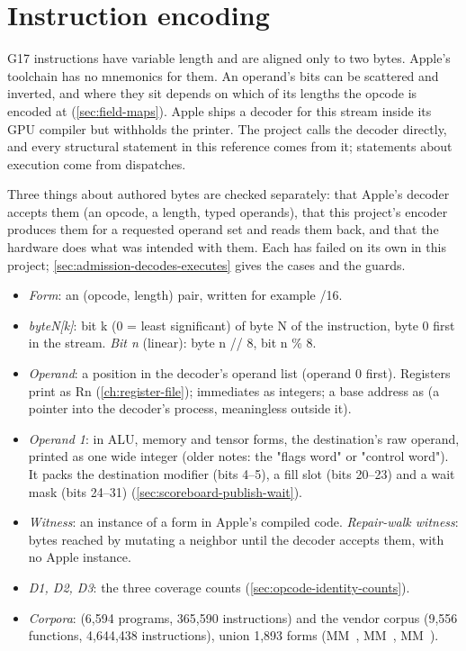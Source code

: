 \chapter{Instruction encoding}\label{ch:instruction-encoding}

G17 instructions have variable length and are aligned only to two bytes. Apple's toolchain has no mnemonics for
them. An operand's bits can be scattered and inverted, and where they sit depends on which of its lengths the opcode
is encoded at (\cref{sec:field-maps}). Apple ships a decoder for this stream inside its GPU compiler but
withholds the printer. The project calls the decoder directly, and every structural statement in this reference comes
from it; statements about execution come from dispatches.

Three things about authored bytes are checked separately: that Apple's decoder accepts them (an opcode, a length,
typed operands), that this project's encoder produces them for a requested operand set and reads them back, and that
the hardware does what was intended with them. Each has failed on its own in this project;
\cref{sec:admission-decodes-executes} gives the cases and the guards.

\begin{itemize}
\item \emph{Form}: an (opcode, length) pair, written for example /16.
\item \emph{byteN{[}k{]}}: bit k (0 = least significant) of byte N of the instruction, byte 0 first in the stream. \emph{Bit n} (linear):
  byte n // 8, bit n \% 8.
\item \emph{Operand}: a position in the decoder's operand list (operand 0 first). Registers print as Rn (\cref{ch:register-file}); immediates as
  integers; a base address as  (a pointer into the decoder's process, meaningless outside it).
\item \emph{Operand 1}: in ALU, memory and tensor forms, the destination's raw operand, printed as one wide integer (older notes:
  the "flags word" or "control word"). It packs the destination modifier (bits 4–5), a fill slot (bits 20–23) and a wait
  mask (bits 24–31) (\cref{sec:scoreboard-publish-wait}).
\item \emph{Witness}: an instance of a form in Apple's compiled code. \emph{Repair-walk witness}: bytes reached by mutating a
  neighbor until the decoder accepts them, with no Apple instance.
\item \emph{D1, D2, D3}: the three coverage counts (\cref{sec:opcode-identity-counts}).
\item \emph{Corpora}:  (6,594 programs, 365,590 instructions) and the vendor corpus (9,556
  functions, 4,644,438 instructions), union 1,893 forms (MM~, MM~, MM~).
\end{itemize}

